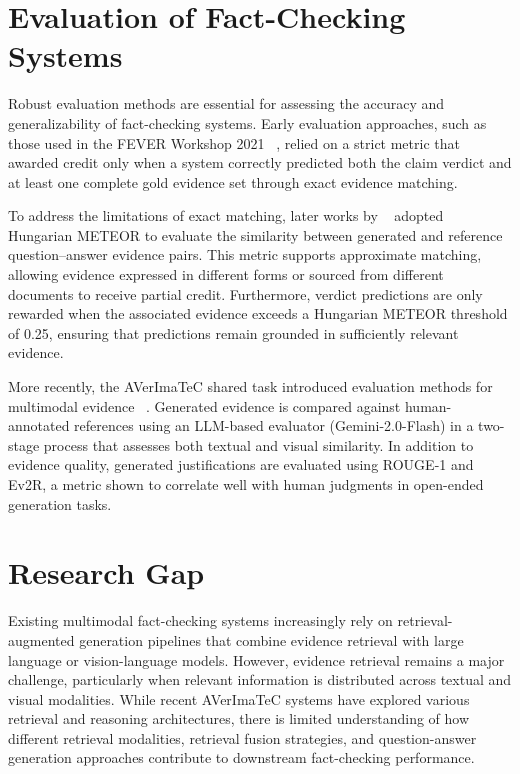 \section{Evaluation of Fact-Checking Systems}

Robust evaluation methods are essential for assessing the accuracy and generalizability of fact-checking systems. Early evaluation approaches, such as those used in the FEVER Workshop 2021 ~\cite{Aly2021Nov}, relied on a strict metric that awarded credit only when a system correctly predicted both the claim verdict and at least one complete gold evidence set through exact evidence matching.

To address the limitations of exact matching, later works by ~\citet{Schlichtkrull2023May} adopted Hungarian METEOR to evaluate the similarity between generated and reference question–answer evidence pairs. This metric supports approximate matching, allowing evidence expressed in different forms or sourced from different documents to receive partial credit. Furthermore, verdict predictions are only rewarded when the associated evidence exceeds a Hungarian METEOR threshold of 0.25, ensuring that predictions remain grounded in sufficiently relevant evidence.

More recently, the AVerImaTeC shared task introduced evaluation methods for multimodal evidence ~\cite{Cao2025May}. Generated evidence is compared against human-annotated references using an LLM-based evaluator (Gemini-2.0-Flash) in a two-stage process that assesses both textual and visual similarity. In addition to evidence quality, generated justifications are evaluated using ROUGE-1 and Ev2R, a metric shown to correlate well with human judgments in open-ended generation tasks.

\section{Research Gap}

Existing multimodal fact-checking systems increasingly rely on retrieval-augmented generation pipelines that combine evidence retrieval with large language or vision-language models. However, evidence retrieval remains a major challenge, particularly when relevant information is distributed across textual and visual modalities. While recent AVerImaTeC systems have explored various retrieval and reasoning architectures, there is limited understanding of how different retrieval modalities, retrieval fusion strategies, and question-answer generation approaches contribute to downstream fact-checking performance.

